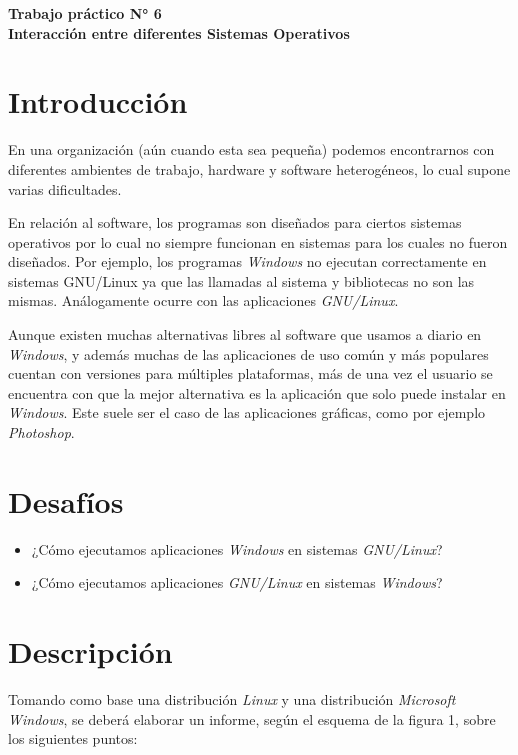 \documentclass[12pt]{article}
\def\maketitle{

    \makeatletter
    {\color{bl} \centering \huge \sc \textbf{
    Trabajo práctico N° 6\\ Interacción entre diferentes Sistemas Operativos
    \large \vspace*{-8pt} \color{black} 
    \vspace*{8pt} }\par}
    \makeatother

    \makeatletter
    
}
\begin{document}
\thispagestyle{empty}
\maketitle
\setlength{\parindent}{0pt}

\section*{Introducción}

En una organización (aún cuando esta sea pequeña) podemos encontrarnos con
diferentes ambientes de trabajo, hardware y software heterogéneos, lo cual
supone varias dificultades.

En relación al software, los programas son diseñados para ciertos sistemas
operativos por lo cual no siempre funcionan en sistemas para los cuales no
fueron diseñados. Por ejemplo, los programas \emph{Windows} no ejecutan
correctamente en sistemas GNU/Linux ya que las llamadas al sistema y
bibliotecas no son las mismas. Análogamente ocurre con las aplicaciones
\emph{GNU/Linux}.

Aunque existen muchas alternativas libres al software que usamos a diario en
\emph{Windows}, y además muchas de las aplicaciones de uso común y más
populares cuentan con versiones para múltiples plataformas, más de una vez el
usuario se encuentra con que la mejor alternativa es la aplicación que solo
puede instalar en \emph{Windows}. Este suele ser el caso de las aplicaciones
gráficas, como por ejemplo \emph{Photoshop}.

\section*{Desafíos}

\begin{itemize}

    \item ¿Cómo ejecutamos aplicaciones \emph{Windows} en sistemas
        \emph{GNU/Linux}?

    \item ¿Cómo ejecutamos aplicaciones \emph{GNU/Linux} en sistemas
        \emph{Windows}?

\end{itemize}

\section*{Descripción}

Tomando como base una distribución \emph{Linux} y una distribución
\emph{Microsoft Windows}, se deberá elaborar un informe, según el esquema de la figura 1, sobre los siguientes puntos:
\end{document}

